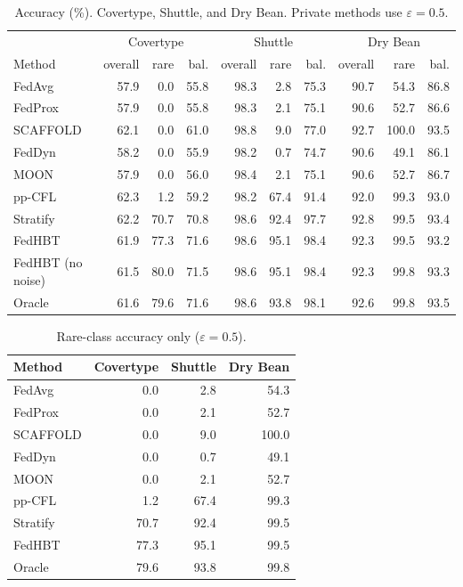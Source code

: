 \documentclass[11pt,a4paper]{article}
\theoremstyle{plain}
\begin{document}
\begin{table}[h]
\centering
\setlength{\tabcolsep}{3.6pt}
\caption{Accuracy (\%). Covertype, Shuttle, and Dry Bean. Private methods use $\varepsilon=0.5$.}
{\small
\begin{tabular}{lrrr rrr rrr}
\toprule
& \multicolumn{3}{c}{Covertype} & \multicolumn{3}{c}{Shuttle} & \multicolumn{3}{c}{Dry Bean} \\
\cmidrule(lr){2-4} \cmidrule(lr){5-7} \cmidrule(lr){8-10}
Method & overall & rare & bal. & overall & rare & bal. & overall & rare & bal. \\
\midrule
FedAvg & 57.9 & 0.0 & 55.8 & 98.3 & 2.8 & 75.3 & 90.7 & 54.3 & 86.8 \\
FedProx & 57.9 & 0.0 & 55.8 & 98.3 & 2.1 & 75.1 & 90.6 & 52.7 & 86.6 \\
SCAFFOLD & 62.1 & 0.0 & 61.0 & 98.8 & 9.0 & 77.0 & 92.7 & 100.0 & 93.5 \\
FedDyn & 58.2 & 0.0 & 55.9 & 98.2 & 0.7 & 74.7 & 90.6 & 49.1 & 86.1 \\
MOON & 57.9 & 0.0 & 56.0 & 98.4 & 2.1 & 75.1 & 90.6 & 52.7 & 86.7 \\
pp-CFL & 62.3 & 1.2 & 59.2 & 98.2 & 67.4 & 91.4 & 92.0 & 99.3 & 93.0 \\
Stratify & 62.2 & 70.7 & 70.8 & 98.6 & 92.4 & 97.7 & 92.8 & 99.5 & 93.4 \\
FedHBT & 61.9 & 77.3 & 71.6 & 98.6 & 95.1 & 98.4 & 92.3 & 99.5 & 93.2 \\
FedHBT (no noise) & 61.5 & 80.0 & 71.5 & 98.6 & 95.1 & 98.4 & 92.3 & 99.8 & 93.3 \\
Oracle & 61.6 & 79.6 & 71.6 & 98.6 & 93.8 & 98.1 & 92.6 & 99.8 & 93.5 \\
\bottomrule
\end{tabular}}
\end{table}

\begin{table}[h]
\centering
\caption{Rare-class accuracy only ($\varepsilon=0.5$).}
\begin{tabular}{Lrrr}
\toprule
Method & Covertype & Shuttle & Dry Bean \\
\midrule
FedAvg & 0.0 & 2.8 & 54.3 \\
FedProx & 0.0 & 2.1 & 52.7 \\
SCAFFOLD & 0.0 & 9.0 & 100.0 \\
FedDyn & 0.0 & 0.7 & 49.1 \\
MOON & 0.0 & 2.1 & 52.7 \\
pp-CFL & 1.2 & 67.4 & 99.3 \\
Stratify & 70.7 & 92.4 & 99.5 \\
FedHBT & 77.3 & 95.1 & 99.5 \\
Oracle & 79.6 & 93.8 & 99.8 \\
\bottomrule
\end{tabular}
\end{table}
\end{document}
